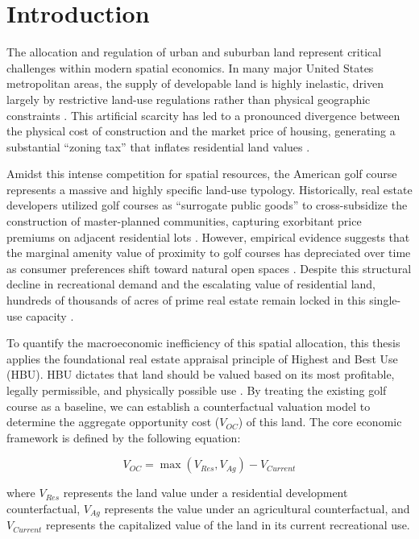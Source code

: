 \documentclass[10pt, letterpaper]{article}
\begin{document}
\section{Introduction}

The allocation and regulation of urban and suburban land represent critical challenges within modern spatial economics. In many major United States metropolitan areas, the supply of developable land is highly inelastic, driven largely by restrictive land-use regulations rather than physical geographic constraints \parencite{Glaeser2017, Gyourko2021}. This artificial scarcity has led to a pronounced divergence between the physical cost of construction and the market price of housing, generating a substantial ``zoning tax'' that inflates residential land values \parencite{Glaeser2005, Davis2021}. 

Amidst this intense competition for spatial resources, the American golf course represents a massive and highly specific land-use typology. Historically, real estate developers utilized golf courses as ``surrogate public goods'' to cross-subsidize the construction of master-planned communities, capturing exorbitant price premiums on adjacent residential lots \parencite{Limehouse2012}. However, empirical evidence suggests that the marginal amenity value of proximity to golf courses has depreciated over time as consumer preferences shift toward natural open spaces \parencite{Cho2009}. Despite this structural decline in recreational demand and the escalating value of residential land, hundreds of thousands of acres of prime real estate remain locked in this single-use capacity \parencite{Weinand2025}.

To quantify the macroeconomic inefficiency of this spatial allocation, this thesis applies the foundational real estate appraisal principle of Highest and Best Use (HBU). HBU dictates that land should be valued based on its most profitable, legally permissible, and physically possible use \parencite{AppraisalInstitute2020}. By treating the existing golf course as a baseline, we can establish a counterfactual valuation model to determine the aggregate opportunity cost ($V_{OC}$) of this land. The core economic framework is defined by the following equation:

\begin{equation}
    V_{OC} = \max(V_{Res}, V_{Ag}) - V_{Current}
\end{equation}

where $V_{Res}$ represents the land value under a residential development counterfactual, $V_{Ag}$ represents the value under an agricultural counterfactual, and $V_{Current}$ represents the capitalized value of the land in its current recreational use. 
\end{document}
